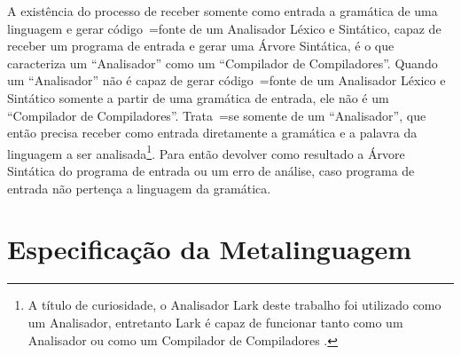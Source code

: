 A existência do processo de receber somente como entrada a gramática de uma linguagem e
gerar código~=fonte de um Analisador Léxico e
Sintático,
capaz de receber um programa de entrada e
gerar uma Árvore Sintática,
é o que caracteriza um ``Analisador'' como um ``Compilador de Compiladores''.
Quando um ``Analisador'' não é capaz de gerar código~=fonte de um Analisador Léxico e
Sintático somente a partir de uma gramática de entrada,
ele não é um ``Compilador de Compiladores''.
Trata~=se somente de um ``Analisador'',
que então precisa receber como entrada diretamente a gramática e
a palavra da linguagem a ser analisada\footnote{
A título de curiosidade,
o Analisador Lark deste trabalho foi utilizado como um Analisador,
entretanto Lark é capaz de funcionar tanto como um Analisador ou
como um Compilador de Compiladores \cite{antlrBookTerrentParr}.
}.
Para então devolver como resultado a Árvore Sintática do programa de entrada ou
um erro de análise,
caso programa de entrada não pertença a linguagem da gramática.


\section{Especificação da Metalinguagem}
\label{section:metalinguagemGrammar}

